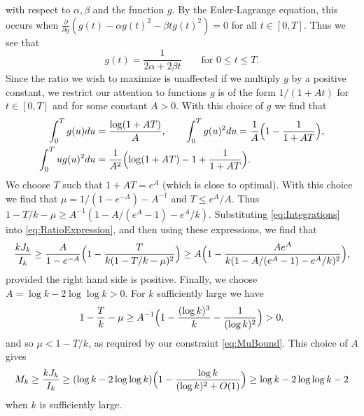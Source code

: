 \documentclass[12pt,a4paper]{amsart}
\theoremstyle{plain}
\numberwithin{sblmm}{thrm}
\numberwithin{equation}{section}
\begin{document}
with respect to $\alpha,\beta$ and the function $g$. By the Euler-Lagrange equation, this occurs when $\frac{\partial}{\partial g}(g(t) - \alpha g(t)^2 -\beta t g(t)^2)=0$ for all $t\in[0,T]$. Thus we see that
\begin{equation}
g(t)=\frac{1}{2\alpha+2\beta t}\qquad \text{for $0\le t\le T$}.
\end{equation}
Since the ratio we wish to maximize is unaffected if we multiply $g$ by a positive constant, we restrict our attention to functions $g$ is of the form $1/(1+At)$ for $t\in[0,T]$ and for some constant $A>0$. With this choice of $g$ we find that
\begin{align}
\int_0^Tg(u)du&=\frac{\log(1+AT)}{A},\qquad \int_0^Tg(u)^2du=\frac{1}{A}\Bigl(1-\frac{1}{1+AT}\Bigr),\label{eq:Integrations}\\
\int_0^Tug(u)^2du&=\frac{1}{A^2}\Bigl(\log(1+AT)-1+\frac{1}{1+AT}\Bigr).
\end{align}
We choose $T$ such that $1+AT=e^A$ (which is close to optimal). With this choice we find that $\mu=1/(1-e^{-A})-A^{-1}$ and $T\le e^A/A$. Thus $1-T/k-\mu\ge A^{-1}(1-A/(e^A-1)-e^A/k)$. Substituting \eqref{eq:Integrations} into \eqref{eq:RatioExpression}, and then using these expressions, we find that
\begin{equation}
\frac{kJ_k}{I_k}\ge \frac{A}{1-e^{-A}}\Bigl(1-\frac{T}{k(1-T/k-\mu)^2}\Bigr)\ge A\Bigl(1-\frac{A e^A}{k(1-A/(e^A-1)-e^A/k)^2}\Bigr),
\end{equation}
provided the right hand side is positive. Finally, we choose $A=\log{k}-2\log\log{k}>0$. For $k$ sufficiently large we have
\begin{equation}
1-\frac{T}{k}-\mu\ge A^{-1}\Bigl(1-\frac{(\log{k})^3}{k}-\frac{1}{(\log{k})^2}\Bigr)>0,
\end{equation}
and so $\mu<1-T/k$, as required by our constraint \eqref{eq:MuBound}. This choice of $A$ gives
\begin{equation}
M_k\ge \frac{kJ_k}{I_k}\ge (\log{k}-2\log\log{k})\Bigl(1-\frac{\log{k}}{(\log{k})^2+O(1)}\Bigr)\ge \log{k}-2\log\log{k}-2
\end{equation}
when $k$ is sufficiently large.
\end{document}

